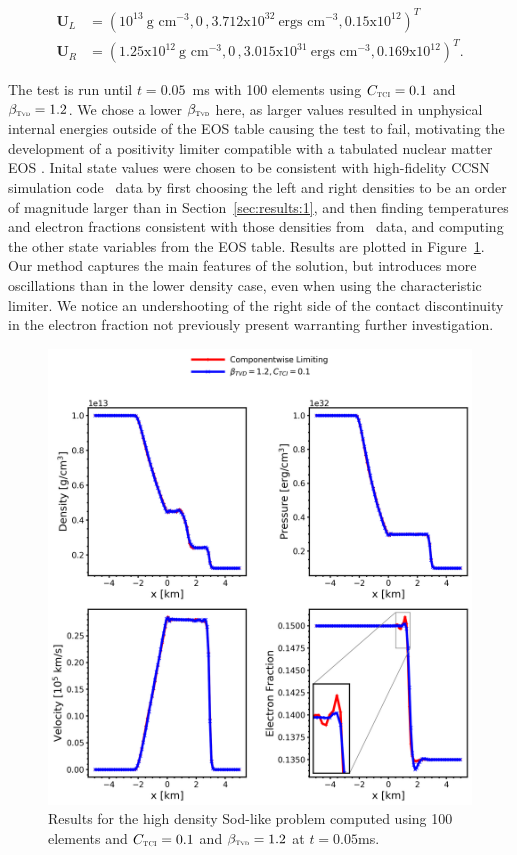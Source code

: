 \documentclass[onecolumn]{aastex62}
\newcommand{\TVD}{\textnormal{\tiny\textsc{Tvd}}}
\newcommand{\TCI}{\textnormal{\tiny\textsc{TCI}}}
\begin{document}
\begin{align*}
  \mathbf{U}_{L} &= (10^{13}~\text{g~cm}^{-3}, 0\,, 3.712\text{x}10^{32}~\text{ergs~cm}^{-3}, 0.15\text{x}10^{12})^T\,\,\, \\
  \mathbf{U}_{R} &= (1.25\text{x}10^{12}~\text{g~cm}^{-3}, 0\, , 3.015\text{x}10^{31}~\text{ergs~cm}^{-3}, 0.169\text{x}10^{12})^T.
\end{align*}

\noindent The test is run until $t = 0.05$~ms with 100 elements
using $C_{\TCI} = 0.1$ and $\beta_{\TVD} = 1.2$. We chose a lower $\beta_{\TVD}$
here, as larger values resulted in unphysical internal energies outside of the
EOS table causing the test to fail, motivating the development of a
positivity limiter compatible with a tabulated nuclear matter EOS \citep{zhang:2010a}.
Inital state values were chosen to be consistent with
high-fidelity CCSN simulation code \chimera\, \citep{bruenn:2018} data by first
choosing the left and right densities to be an order of magnitude larger than in
Section~\ref{sec:results:1}, and then finding temperatures and electron fractions
consistent with those densities from \chimera\, data, and computing the other
state variables from the EOS table.
Results are plotted in
Figure~\ref{fig:SodSedovHighDens}. Our method captures the main features
of the solution, but introduces more oscillations than in the lower density
case, even when using the characteristic limiter.
We notice an undershooting of the right side
of the contact discontinuity in the electron fraction not previously present
warranting further investigation.

\begin{figure}[h!]
  \centering
  \includegraphics[width=36pc]{./figures/highDens.png}
  \caption{\label{fig:SodSedovHighDens} Results for the high density Sod-like problem
  computed using 100 elements and $C_{\TCI} = 0.1$ and $\beta_{\TVD} = 1.2$ at $t=0.05$ms.}
\end{figure}
\end{document}
